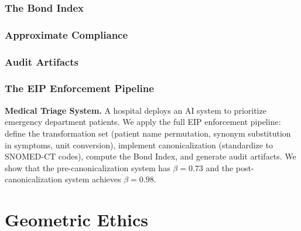 \documentclass[12pt,letterpaper,twoside,openright]{book}
\theoremstyle{plain}
\theoremstyle{definition}
\theoremstyle{remark}
\newcommand{\calT}{\mathcal{T}}
\begin{document}
\section{The Bond Index}

\section{Approximate Compliance}

\section{Audit Artifacts}

\section{The EIP Enforcement Pipeline}

\begin{casestudy}
\textbf{Medical Triage System.} A hospital deploys an AI system to prioritize emergency department patients. We apply the full EIP enforcement pipeline: define the transformation set (patient name permutation, synonym substitution in symptoms, unit conversion), implement canonicalization (standardize to SNOMED-CT codes), compute the Bond Index, and generate audit artifacts. We show that the pre-canonicalization system has $\beta = 0.73$ and the post-canonicalization system achieves $\beta = 0.98$.
\end{casestudy}


\part{Geometric Ethics}
\label{part:geometric-ethics}
\end{document}
